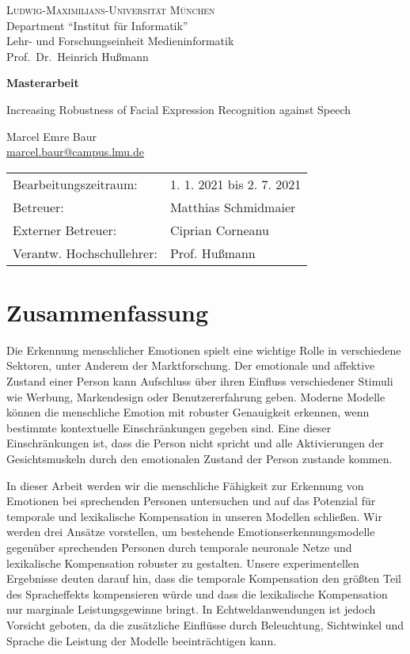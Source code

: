 \documentclass[11pt,a4paper,twoside]{article}
\begin{document}
\pagestyle{empty} %

\begin{center}
\textsc{Ludwig-Maximilians-Universität München}\\
Department ``Institut für Informatik''\\
Lehr- und Forschungseinheit Medieninformatik\\
Prof.\ Dr.\ Heinrich Hußmann

\vspace{5cm}
{\large\textbf{Masterarbeit}}\vspace{.5cm}

{\LARGE Increasing Robustness of Facial Expression Recognition against Speech}\vspace{1cm}

{\large Marcel Emre Baur}\\\href{mailto:marcel.baur@campus.lmu.de}{marcel.baur@campus.lmu.de}

\end{center}
\vfill

\begin{tabular}{ll}
Bearbeitungszeitraum: & 1. 1. 2021 bis 2. 7. 2021\\
Betreuer: & Matthias Schmidmaier\\
Externer Betreuer: & Ciprian Corneanu\\
Verantw. Hochschullehrer: & Prof. Hußmann
\end{tabular}

\clearpage
\section*{Zusammenfassung}
Die Erkennung menschlicher Emotionen spielt eine wichtige Rolle in verschiedene Sektoren, unter Anderem der Marktforschung. Der emotionale und affektive Zustand einer Person kann Aufschluss über ihren Einfluss verschiedener Stimuli wie Werbung, Markendesign oder Benutzererfahrung geben. Moderne Modelle können die menschliche Emotion mit robuster Genauigkeit erkennen, wenn bestimmte kontextuelle Einschränkungen gegeben sind. Eine dieser Einschränkungen ist, dass die Person nicht spricht und alle Aktivierungen der Gesichtsmuskeln durch den emotionalen Zustand der Person zustande kommen.


In dieser Arbeit werden wir die menschliche Fähigkeit zur Erkennung von Emotionen bei sprechenden Personen untersuchen und auf das Potenzial für temporale und lexikalische Kompensation in unseren Modellen schließen. Wir werden drei Ansätze vorstellen, um bestehende Emotionserkennungsmodelle gegenüber sprechenden Personen durch temporale neuronale Netze und lexikalische Kompensation robuster zu gestalten. Unsere experimentellen Ergebnisse deuten darauf hin, dass die temporale Kompensation den größten Teil des Spracheffekts kompensieren würde und dass die lexikalische Kompensation nur marginale Leistungsgewinne bringt. In Echtweldanwendungen ist jedoch Vorsicht geboten, da die zusätzliche Einflüsse durch Beleuchtung, Sichtwinkel und Sprache die Leistung der Modelle beeinträchtigen kann.
\end{document}
